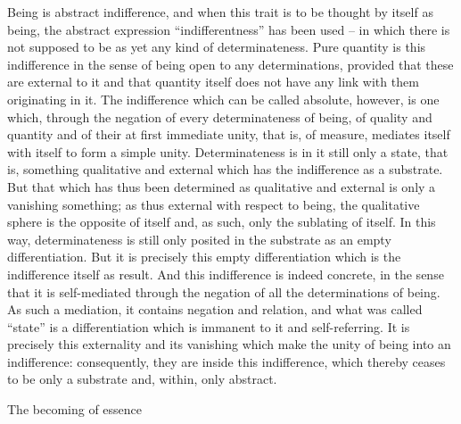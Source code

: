 Being is abstract indifference, and when this trait is to be thought by itself as
being, the abstract expression “indifferentness” has been used – in which
there is not supposed to be as yet any kind of determinateness. Pure quantity
is this indifference in the sense of being open to any determinations,
provided that these are external to it and that quantity itself does not
have any link with them originating in it. The indifference which can
be called absolute, however, is one which, through the negation of every
determinateness of being, of quality and quantity and of their at first
immediate unity, that is, of measure, mediates itself with itself to form a
simple unity. Determinateness is in it still only a state, that is, something
qualitative and external which has the indifference as a substrate.
But that which has thus been determined as qualitative and external
is only a vanishing something; as thus external with respect to being, the
qualitative sphere is the opposite of itself and, as such, only the sublating
of itself. In this way, determinateness is still only posited in the substrate
as an empty differentiation. But it is precisely this empty differentiation
which is the indifference itself as result. And this indifference is indeed
concrete, in the sense that it is self-mediated through the negation of all
the determinations of being. As such a mediation, it contains negation and
relation, and what was called “state” is a differentiation which is immanent
to it and self-referring. It is precisely this externality and its vanishing which
make the unity of being into an indifference: consequently, they are inside
this indifference, which thereby ceases to be only a substrate and, within,
only abstract.

The becoming of essence

